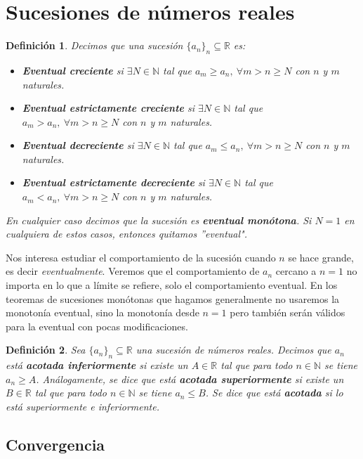 \documentclass{article}
\newtheorem{define}{Definición}
\begin{document}
\newpage
\section{Sucesiones de números reales}
\begin{define}Decimos que una sucesión $\{a_n\}_n \subseteq \mathbb{R}$ es:
	\begin{itemize}
		\item
		\textbf{Eventual creciente} si $\exists N \in \mathbb{N}$ tal que $a_m \geq a_n,\ \forall m>n\geq N$ con $n$ y $m$ naturales.
		\item
		\textbf{Eventual estrictamente creciente} si $\exists N \in \mathbb{N}$ tal que $a_m > a_n,\ \forall m>n\geq N$ con $n$ y $m$ naturales.
		\item
		\textbf{Eventual decreciente} si $\exists N \in \mathbb{N}$ tal que $a_m \leq a_n,\ \forall m>n\geq N$ con $n$ y $m$ naturales.
		\item
		\textbf{Eventual estrictamente decreciente} si $\exists N \in \mathbb{N}$ tal que $a_m < a_n,\ \forall m>n\geq N$ con $n$ y $m$ naturales.
	\end{itemize}
	En cualquier caso decimos que la sucesión es \textbf{eventual monótona}. Si $N = 1$ en cualquiera de estos casos, entonces quitamos ''eventual".
\end{define}
Nos interesa estudiar el comportamiento de la sucesión cuando $n$ se hace grande, es decir \textit{eventualmente}. Veremos que el comportamiento de $a_n$ cercano a $n = 1$ no importa
en lo que a límite se refiere, solo el comportamiento eventual. En los teoremas de sucesiones monótonas que hagamos generalmente no usaremos la monotonía eventual, sino la monotonía desde $n = 1$ pero también serán válidos para la eventual con pocas modificaciones.

\begin{define}
	Sea $\{ a_n\}_n \subseteq \mathbb{R}$ una sucesión de números reales. Decimos que $a_n$ está \textbf{acotada inferiormente} si existe un $A \in \mathbb{R}$ tal que para todo $n \in \mathbb{N}$ se tiene $a_n \geq A$. Análogamente, se dice que está \textbf{acotada superiormente} si existe un $B \in \mathbb{R}$ tal que para todo $n \in \mathbb{N}$ se tiene $a_n \leq B$. Se dice que está \textbf{acotada} si lo está superiormente e inferiormente.
\end{define}

\subsection{Convergencia}
\end{document}

